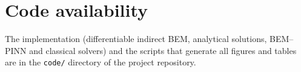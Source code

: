 \documentclass[11pt,twoside]{article}
\begin{document}
\section*{Code availability}
The implementation (differentiable indirect BEM, analytical solutions, BEM--PINN and classical solvers) and the scripts that generate all figures and tables are in the \texttt{code/} directory of the project repository.


\end{document}
